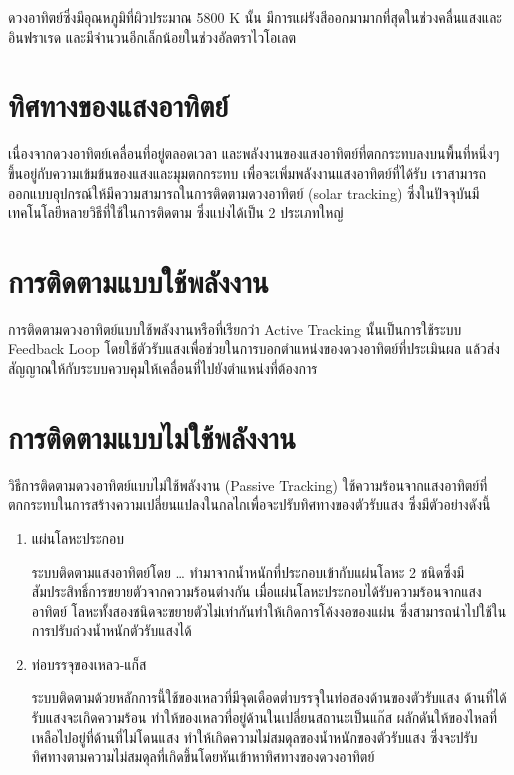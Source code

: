 \documentclass[a4paper,nobib,openany]{tufte-book}
\begin{document}
ดวงอาทิตย์ซึ่งมีอุณหภูมิที่ผิวประมาณ 5800 K นั้น
มีการแผ่รังสีออกมามากที่สุดในช่วงคลื่นแสงและอินฟราเรด
และมีจำนวนอีกเล็กน้อยในช่วงอัลตราไวโอเลต

\section{ทิศทางของแสงอาทิตย์}
\label{sec:org4d96239}
เนื่องจากดวงอาทิตย์เคลื่อนที่อยู่ตลอดเวลา
และพลังงานของแสงอาทิตย์ที่ตกกระทบลงบนพื้นที่หนึ่งๆขึ้นอยู่กับความเข้มข้นของแสงและมุมตกกระทบ
เพื่อจะเพิ่มพลังงานแสงอาทิตย์ที่ได้รับ
เราสามารถออกแบบอุปกรณ์ให้มีความสามารถในการติดตามดวงอาทิตย์ (solar
tracking) ซึ่งในปัจจุบันมีเทคโนโลยีหลายวิธีที่ใช้ในการติดตาม
ซึ่งแบ่งได้เป็น 2 ประเภทใหญ่

\section{การติดตามแบบใช้พลังงาน}
\label{sec:orgdbe45a1}
การติดตามดวงอาทิตย์แบบใช้พลังงานหรือที่เรียกว่า Active Tracking
นั้นเป็นการใช้ระบบ Feedback Loop
โดยใช้ตัวรับแสงเพื่อช่วยในการบอกตำแหน่งของดวงอาทิตย์ที่ประเมินผล
แล้วส่งสัญญาณให้กับระบบควบคุมให้เคลื่อนที่ไปยังตำแหน่งที่ต้องการ

\section{การติดตามแบบไม่ใช้พลังงาน}
\label{sec:org66c4b5d}
วิธีการติดตามดวงอาทิตย์แบบไม่ใช้พลังงาน (Passive Tracking)
ใช้ความร้อนจากแสงอาทิตย์ที่ตกกระทบในการสร้างความเปลี่ยนแปลงในกลไกเพื่อจะปรับทิศทางของตัวรับแสง
ซึ่งมีตัวอย่างดังนี้

\begin{enumerate}
\item แผ่นโลหะประกอบ

ระบบติดตามแสงอาทิตย์โดย \ldots{} ทำมาจากน้ำหนักที่ประกอบเข้ากับแผ่นโลหะ 2
ชนิดซึ่งมีสัมประสิทธิ์การขยายตัวจากความร้อนต่างกัน
เมื่อแผ่นโลหะประกอบได้รับความร้อนจากแสงอาทิตย์
โลหะทั้งสองชนิดจะขยายตัวไม่เท่ากันทำให้เกิดการโค้งงอของแผ่น
ซึ่งสามารถนำไปใช้ในการปรับถ่วงน้ำหนักตัวรับแสงได้

\item ท่อบรรจุของเหลว-แก็ส

ระบบติดตามด้วยหลักการนี้ใช้ของเหลวที่มีจุดเดือดต่ำบรรจุในท่อสองด้านของตัวรับแสง
ด้านที่ได้รับแสงจะเกิดความร้อน
ทำให้ของเหลวที่อยู่ด้านในเปลี่ยนสถานะเป็นแก๊ส
ผลักดันให้ของไหลที่เหลือไปอยู่ที่ด้านที่ไม่โดนแสง
ทำให้เกิดความไม่สมดุลของน้ำหนักของตัวรับแสง
ซึ่งจะปรับทิศทางตามความไม่สมดุลที่เกิดขึ้นโดยหันเข้าหาทิศทางของดวงอาทิตย์
\end{enumerate}
\end{document}
